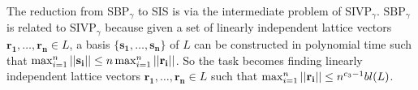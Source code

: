 \documentclass[../main.tex]{subfiles}
\begin{document}

The reduction from SBP$_{\gamma}$ to SIS is via the intermediate problem of SIVP$_{\gamma}$. 
$\text{SBP}_{\gamma}$ is related to $\text{SIVP}_{\gamma}$ because given a set of linearly independent lattice vectors $\mathbf{r_1}, \dots, \mathbf{r_n} \in L$, a basis $\{\mathbf{s_1}, \dots, \mathbf{s_n}\}$ of $L$ can be constructed in polynomial time such that $\max_{i=1}^n ||\mathbf{s_i}|| \le n \max_{i=1}^n ||\mathbf{r_i}||$. So the task becomes finding linearly independent lattice vectors $\mathbf{r_1}, \dots, \mathbf{r_n} \in L$ such that $\max_{i=1}^n ||\mathbf{r_i}|| \le n^{c_3-1}bl(L)$.

    
    
\end{document}
